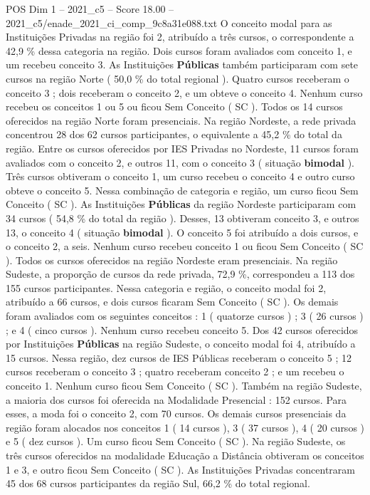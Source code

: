 \begin{textsample}{POS Dim 1 – 2021\_c5 – Score 18.00 – 2021\_c5/enade\_2021\_ci\_comp\_9c8a31e088.txt}
O conceito modal para as Instituições Privadas na região foi 2, atribuído a três cursos, o correspondente a 42,9 \% dessa categoria na região.
Dois cursos foram avaliados com conceito 1, e um recebeu conceito 3.
As Instituições \textbf{Públicas} também participaram com sete cursos na região Norte ( 50,0 \% do total regional ).
Quatro cursos receberam o conceito 3 ; dois receberam o conceito 2, e um obteve o conceito 4.
Nenhum curso recebeu os conceitos 1 ou 5 ou ficou Sem Conceito ( SC ).
Todos os 14 cursos oferecidos na região Norte foram presenciais.
Na região Nordeste, a rede privada concentrou 28 dos 62 cursos participantes, o equivalente a 45,2 \% do total da região.
Entre os cursos oferecidos por IES Privadas no Nordeste, 11 cursos foram avaliados com o conceito 2, e outros 11, com o conceito 3 ( situação \textbf{bimodal} ).
Três cursos obtiveram o conceito 1, um curso recebeu o conceito 4 e outro curso obteve o conceito 5.
Nessa combinação de categoria e região, um curso ficou Sem Conceito ( SC ).
As Instituições \textbf{Públicas} da região Nordeste participaram com 34 cursos ( 54,8 \% do total da região ).
Desses, 13 obtiveram conceito 3, e outros 13, o conceito 4 ( situação \textbf{bimodal} ).
O conceito 5 foi atribuído a dois cursos, e o conceito 2, a seis.
Nenhum curso recebeu conceito 1 ou ficou Sem Conceito ( SC ).
Todos os cursos oferecidos na região Nordeste eram presenciais.
Na região Sudeste, a proporção de cursos da rede privada, 72,9 \%, correspondeu a 113 dos 155 cursos participantes.
Nessa categoria e região, o conceito modal foi 2, atribuído a 66 cursos, e dois cursos ficaram Sem Conceito ( SC ).
Os demais foram avaliados com os seguintes conceitos : 1 ( quatorze cursos ) ; 3 ( 26 cursos ) ; e 4 ( cinco cursos ).
Nenhum curso recebeu conceito 5.
Dos 42 cursos oferecidos por Instituições \textbf{Públicas} na região Sudeste, o conceito modal foi 4, atribuído a 15 cursos.
Nessa região, dez cursos de IES Públicas receberam o conceito 5 ; 12 cursos receberam o conceito 3 ; quatro receberam conceito 2 ; e um recebeu o conceito 1.
Nenhum curso ficou Sem Conceito ( SC ).
Também na região Sudeste, a maioria dos cursos foi oferecida na Modalidade Presencial : 152 cursos.
Para esses, a moda foi o conceito 2, com 70 cursos.
Os demais cursos presenciais da região foram alocados nos conceitos 1 ( 14 cursos ), 3 ( 37 cursos ), 4 ( 20 cursos ) e 5 ( dez cursos ).
Um curso ficou Sem Conceito ( SC ).
Na região Sudeste, os três cursos oferecidos na modalidade Educação a Distância obtiveram os conceitos 1 e 3, e outro ficou Sem Conceito ( SC ).
As Instituições Privadas concentraram 45 dos 68 cursos participantes da região Sul, 66,2 \% do total regional.

\end{textsample}
